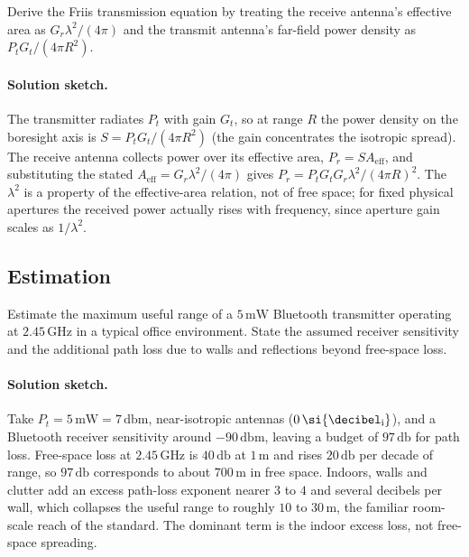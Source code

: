 \begin{exercise}
Derive the Friis transmission equation by treating the receive
antenna's effective area as $G_{r}\lambda^{2}/(4\pi)$ and the
transmit antenna's far-field power density as $P_{t} G_{t}/(4\pi
R^{2})$.
\paragraph{Solution sketch.} The transmitter radiates $P_{t}$ with gain
$G_{t}$, so at range $R$ the power density on the boresight axis is $S =
P_{t}G_{t}/(4\pi R^{2})$ (the gain concentrates the isotropic spread).
The receive antenna collects power over its effective area, $P_{r} = S
A_{\text{eff}}$, and substituting the stated $A_{\text{eff}} = G_{r}
\lambda^{2}/(4\pi)$ gives $P_{r} = P_{t}G_{t}G_{r}\lambda^{2}/(4\pi
R)^{2}$. The $\lambda^{2}$ is a property of the effective-area relation,
not of free space; for fixed physical apertures the received power
actually rises with frequency, since aperture gain scales as
$1/\lambda^{2}$.
\end{exercise}

\subsection*{Estimation}

\begin{exercise}
Estimate the maximum useful range of a $5\,\si{\milli\watt}$
Bluetooth transmitter operating at $2.45\,\si{\giga\hertz}$ in a
typical office environment. State the assumed receiver sensitivity
and the additional path loss due to walls and reflections beyond
free-space loss.
\paragraph{Solution sketch.} Take $P_{t} = 5\,\si{\milli\watt} = 7\,\si{
\decibel}\text{m}$, near-isotropic antennas
($0\,\si{\decibel\textsubscript{i}}$), and a Bluetooth receiver
sensitivity around $-90\,\si{
\decibel}\text{m}$, leaving a budget of $97\,\si{\decibel}$ for path
loss. Free-space loss at $2.45\,\si{\giga\hertz}$ is $40\,\si{\decibel}$
at $1\,\si{\meter}$ and rises $20\,\si{\decibel}$ per decade of range,
so $97\,\si{\decibel}$ corresponds to about $700\,\si{\meter}$ in free
space. Indoors, walls and clutter add an excess path-loss exponent
nearer $3$ to $4$ and several decibels per wall, which collapses the
useful range to roughly $10$ to $30\,\si{\meter}$, the familiar
room-scale reach of the standard. The dominant term is the indoor
excess loss, not free-space spreading.
\end{exercise}

